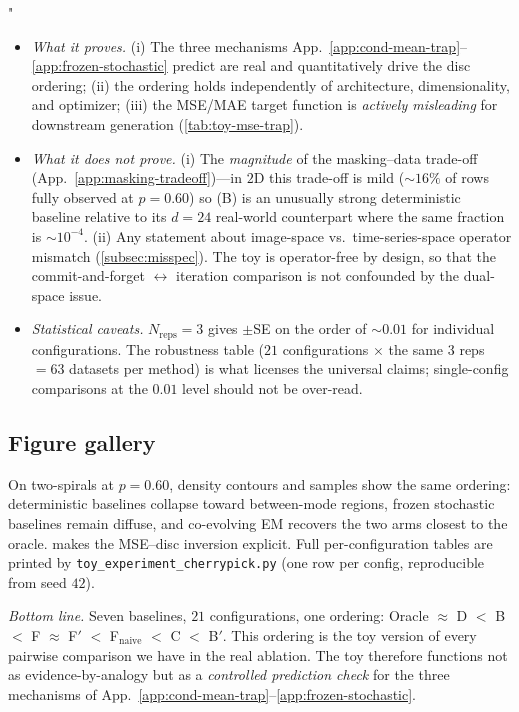 "\documentclass{article}
\theoremstyle{plain}
\theoremstyle{definition}
\theoremstyle{remark}
\begin{document}
\begin{itemize}
\setlength{\itemsep}{0pt}
\item \emph{What it proves.} (i) The three mechanisms App.~\ref{app:cond-mean-trap}--\ref{app:frozen-stochastic} predict are real and quantitatively drive the disc ordering; (ii) the ordering holds independently of architecture, dimensionality, and optimizer; (iii) the MSE/MAE target function is \emph{actively misleading} for downstream generation (\cref{tab:toy-mse-trap}).
\item \emph{What it does not prove.} (i) The \emph{magnitude} of the masking--data trade-off (App.~\ref{app:masking-tradeoff})---in $2$D this trade-off is mild (${\sim}16\%$ of rows fully observed at $p = 0.60$) so (B) is an unusually strong deterministic baseline relative to its $d = 24$ real-world counterpart where the same fraction is $\sim 10^{-4}$. (ii) Any statement about image-space vs.\ time-series-space operator mismatch (\cref{subsec:misspec}). The toy is operator-free by design, so that the commit-and-forget $\leftrightarrow$ iteration comparison is not confounded by the dual-space issue.
\item \emph{Statistical caveats.} $N_{\mathrm{reps}} = 3$ gives $\pm$SE on the order of ${\sim}0.01$ for individual configurations. The robustness table ($21$ configurations $\times$ the same $3$ reps $= 63$ datasets per method) is what licenses the universal claims; single-config comparisons at the $0.01$ level should not be over-read.
\end{itemize}

\subsection{Figure gallery}

On two-spirals at $p = 0.60$, density contours and samples show the same ordering: deterministic baselines collapse toward between-mode regions, frozen stochastic baselines remain diffuse, and co-evolving EM recovers the two arms closest to the oracle.  makes the MSE--disc inversion explicit. Full per-configuration tables are printed by \texttt{toy\_experiment\_cherrypick.py} (one row per config, reproducible from seed $42$).

\emph{Bottom line.} Seven baselines, $21$ configurations, one ordering: Oracle $\approx$ D $<$ B $<$ F $\approx$ F$'$ $<$ F$_{\mathrm{naive}}$ $<$ C $<$ B$'$. This ordering is the toy version of every pairwise comparison we have in the real ablation. The toy therefore functions not as evidence-by-analogy but as a \emph{controlled prediction check} for the three mechanisms of App.~\ref{app:cond-mean-trap}--\ref{app:frozen-stochastic}.
\end{document}
